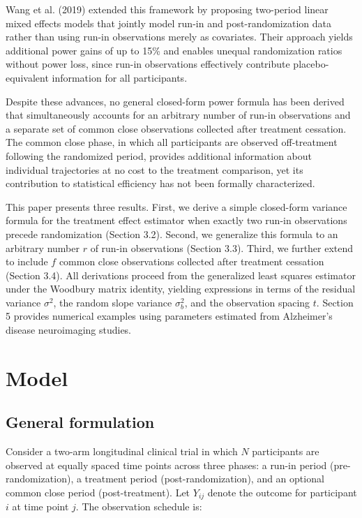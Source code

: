\documentclass[
]{article}
\begin{document}
Wang et al. (2019) extended this framework by proposing two-period
linear mixed effects models that jointly model run-in and
post-randomization data rather than using run-in observations merely as
covariates. Their approach yields additional power gains of up to 15\%
and enables unequal randomization ratios without power loss, since
run-in observations effectively contribute placebo-equivalent
information for all participants.

Despite these advances, no general closed-form power formula has been
derived that simultaneously accounts for an arbitrary number of run-in
observations and a separate set of common close observations collected
after treatment cessation. The common close phase, in which all
participants are observed off-treatment following the randomized period,
provides additional information about individual trajectories at no cost
to the treatment comparison, yet its contribution to statistical
efficiency has not been formally characterized.

This paper presents three results. First, we derive a simple closed-form
variance formula for the treatment effect estimator when exactly two
run-in observations precede randomization (Section 3.2). Second, we
generalize this formula to an arbitrary number \(r\) of run-in
observations (Section 3.3). Third, we further extend to include \(f\)
common close observations collected after treatment cessation (Section
3.4). All derivations proceed from the generalized least squares
estimator under the Woodbury matrix identity, yielding expressions in
terms of the residual variance \(\sigma^2\), the random slope variance
\(\sigma_b^2\), and the observation spacing \(t\). Section 5 provides
numerical examples using parameters estimated from Alzheimer's disease
neuroimaging studies.

\section{Model}\label{model}

\subsection{General formulation}\label{general-formulation}

Consider a two-arm longitudinal clinical trial in which \(N\)
participants are observed at equally spaced time points across three
phases: a run-in period (pre-randomization), a treatment period
(post-randomization), and an optional common close period
(post-treatment). Let \(Y_{ij}\) denote the outcome for participant
\(i\) at time point \(j\). The observation schedule is:
\end{document}
